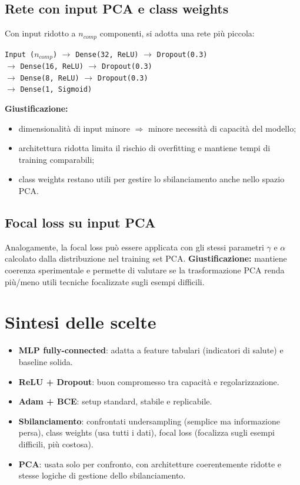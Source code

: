 \subsection{Rete con input PCA e class weights}
Con input ridotto a $n_{comp}$ componenti, si adotta una rete più piccola:
\begin{center}
\texttt{Input ($n_{comp}$)} $\rightarrow$ \texttt{Dense(32, ReLU)} $\rightarrow$ \texttt{Dropout(0.3)} \\
$\rightarrow$ \texttt{Dense(16, ReLU)} $\rightarrow$ \texttt{Dropout(0.3)} \\
$\rightarrow$ \texttt{Dense(8, ReLU)} $\rightarrow$ \texttt{Dropout(0.3)} \\
$\rightarrow$ \texttt{Dense(1, Sigmoid)}
\end{center}
\textbf{Giustificazione:}
\begin{itemize}
  \item dimensionalità di input minore $\Rightarrow$ minore necessità di capacità del modello;
  \item architettura ridotta limita il rischio di overfitting e mantiene tempi di training comparabili;
  \item class weights restano utili per gestire lo sbilanciamento anche nello spazio PCA.
\end{itemize}

\subsection{Focal loss su input PCA}
Analogamente, la focal loss può essere applicata con gli stessi parametri $\gamma$ e $\alpha$ calcolato dalla distribuzione nel training set PCA.
\textbf{Giustificazione:} mantiene coerenza sperimentale e permette di valutare se la trasformazione PCA renda più/meno utili tecniche focalizzate sugli esempi difficili.

\section{Sintesi delle scelte}
\begin{itemize}
  \item \textbf{MLP fully-connected}: adatta a feature tabulari (indicatori di salute) e baseline solida.
  \item \textbf{ReLU + Dropout}: buon compromesso tra capacità e regolarizzazione.
  \item \textbf{Adam + BCE}: setup standard, stabile e replicabile.
  \item \textbf{Sbilanciamento}: confrontati undersampling (semplice ma informazione persa), class weights (usa tutti i dati), focal loss (focalizza sugli esempi difficili, più costosa).
  \item \textbf{PCA}: usata solo per confronto, con architetture coerentemente ridotte e stesse logiche di gestione dello sbilanciamento.
\end{itemize}

